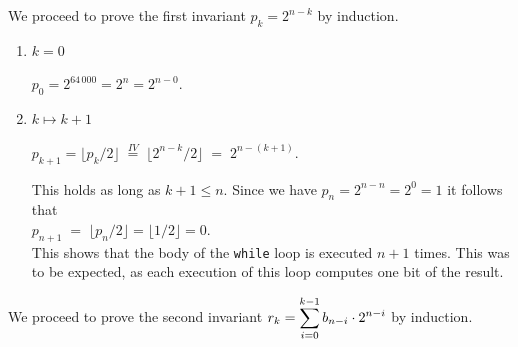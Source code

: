 We proceed to prove the first invariant $p_k = 2^{n-k}$ by induction.  
\begin{enumerate}
\item[B.C.:] $k = 0$

             $p_0 = 2^{64\,000} = 2^{n} = 2^{n-0}$. 
\item[I.S.:] $k \mapsto k + 1$

  $p_{k+1} = \lfloor p_k / 2 \rfloor \;\stackrel{IV}{=}\;
     \bigl\lfloor 2^{n-k} / 2 \bigr\rfloor \;=\; 2^{n-(k+1)}$.

   This holds as long as $k+1 \leq n$.  Since we have $p_{n} = 2^{n-n} = 2^0 = 1$ it follows that
   \\[0.2cm]
   \hspace*{1.3cm}
   $p_{n+1} \;=\; \lfloor p_{n} / 2 \rfloor = \lfloor 1 / 2 \rfloor = 0$.
   \\[0.2cm]
   This shows that the body of the \texttt{while} loop is executed $n+1$ times.  This was to be expected, as
   each execution of this loop computes one bit of the result.
\end{enumerate}
We proceed to prove the second invariant $\displaystyle r_k = \sum\limits_{i=0}^{k-1} b_{n-i} \cdot 2^{n-i}$ by induction.
